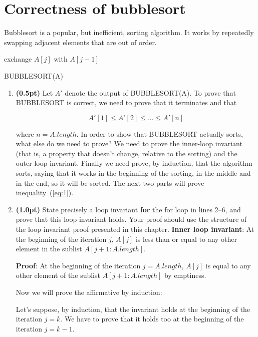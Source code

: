 \documentclass{article}
\begin{document}
\section{Correctness of bubblesort}
Bubblesort is a popular, but inefficient, sorting algorithm. It works by repeatedly swapping adjacent elements that are out of order.

\begin{algorithm}[H]
\SetAlgoLined
   {
     {
       {
        exchange $A[j]$ with $A[j-1]$
      }
    }
  }
\caption{BUBBLESORT(A)}
\end{algorithm}

\begin{enumerate}[label=\Alph*]
  \item \textbf{(0.5pt)} Let $A'$ denote the output of BUBBLESORT(A). To prove that BUBBLESORT is correct, we need to prove that it terminates and that
  
  \begin{equation} \label{eq:1}
    A'[1] \leq A'[2] \leq ... \leq A'[n]
  \end{equation}
  
  where $n = A.length$. In order to show that BUBBLESORT actually sorts, what else do we need to prove?
  \bigbreak
  We need to prove the inner-loop invariant (that is, a property that doesn't change, relative to the sorting) and the outer-loop invariant. Finally we need prove, by induction, that the algorithm sorts, saying that it works in the beginning of the sorting, in the middle and in the end, so it will be sorted.
  \bigbreak
  The next two parts will prove inequality~(\ref{eq:1}).
  
  \item \textbf{(1.0pt)} State precisely a loop invariant \textbf{for} the for loop in lines 2–6, and prove that this loop invariant holds. Your proof should use the structure of the loop invariant proof presented in this chapter.
  \bigbreak
  \textbf{Inner loop invariant}: At the beginning of the iteration $j$, $A[j]$ is less than or equal to any other element in the sublist $A[j + 1:A.length]$.
  
  \textbf{Proof}: At the beginning of the iteration $j = A.length$, $A[j]$ is equal to any other element of the sublist $A[j + 1:A.length]$ by emptiness. 
  
  Now we will prove the affirmative by induction:
  
  Let's suppose, by induction, that the invariant holds at the beginning of the iteration $j = k$. We have to prove that it holds too at the beginning of the iteration $j = k - 1$.
  

\end{enumerate}
\end{document}
